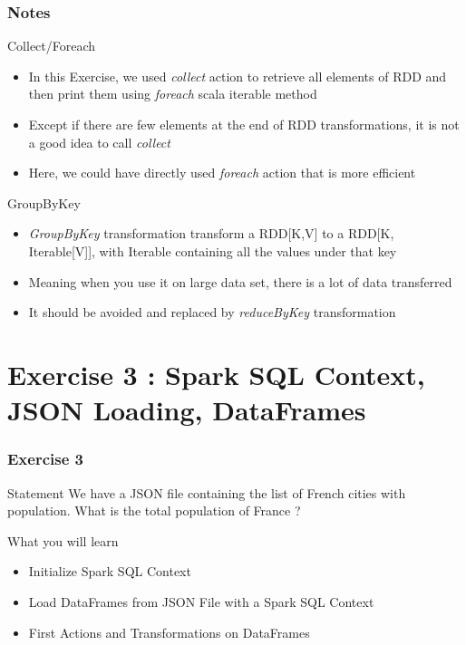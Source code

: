 \documentclass[slidetop,9pt,utf8]{beamer}
\begin{document}
\begin{frame}
  \frametitle{Notes}

  \begin{exampleblock}{Collect/Foreach}
    \begin{itemize}
      \item In this Exercise, we used \textit{collect} action to retrieve all elements of RDD and then print them using \textit{foreach} scala iterable method
      \item Except if there are few elements at the end of RDD transformations, it is not a good idea to call \textit{collect}
      \item Here, we could have directly used \textit{foreach} action that is more efficient
    \end{itemize}
  \end{exampleblock}

  \begin{exampleblock}{GroupByKey}
    \begin{itemize}
      \item \textit{GroupByKey} transformation transform a RDD[K,V] to a RDD[K, Iterable[V]], with Iterable containing all the values under that key
      \item Meaning when you use it on large data set, there is a lot of data transferred
      \item It should be avoided and replaced by \textit{reduceByKey} transformation
    \end{itemize}
  \end{exampleblock}

\end{frame}

%
%
%
%

\section{Exercise 3 : Spark SQL Context, JSON Loading, DataFrames}

\begin{frame}
  \frametitle{Exercise 3}

  \begin{block}{Statement}
    We have a JSON file containing the list of French cities with population. What is the total population of France ?
  \end{block}

  \begin{block}{What you will learn}
    \begin{itemize}
      \item Initialize Spark SQL Context
      \item Load DataFrames from JSON File with a Spark SQL Context
      \item First Actions and Transformations on DataFrames
    \end{itemize}
  \end{block}

\end{frame}
\end{document}
